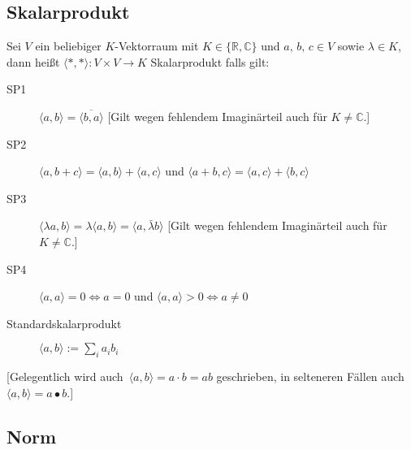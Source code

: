 \subsection{Skalarprodukt}
Sei $V$ ein beliebiger $K$-Vektorraum mit $K\in\{\mathbb{R},\mathbb{C}\}$ und $a,\, b,\, c\in V$ sowie $\lambda\in K$, dann heißt $\langle \ast,\ast \rangle : V\times V\to K$ Skalarprodukt falls gilt:
\begin{description}
  \item [{SP1}]
	$\langle a,b\rangle =\overline{\langle b,a\rangle}$
	[Gilt wegen fehlendem Imaginärteil auch für $K\ne\mathbb{C}$.]
  \item [{SP2}]
	$\langle a,b+c\rangle =\langle a,b\rangle +\langle a,c\rangle $
	und $\langle a+b,c\rangle =\langle a,c\rangle +\langle b,c\rangle $
  \item [{SP3}]
	$\langle \lambda a,b\rangle =\lambda\langle a,b\rangle =\langle a,\bar{\lambda}b\rangle $
	[Gilt wegen fehlendem Imaginärteil auch für $K\ne\mathbb{C}$.]
  \item [{SP4}]
	$\langle a,a \rangle = 0 \iff a=0$
	und $\langle a,a \rangle > 0 \iff a\ne0$
  \item [{Standardskalarprodukt}] $\langle a,b \rangle := \sum_i a_i b_i$
\end{description}

[Gelegentlich wird auch~$\langle a,b \rangle = a \cdot b = ab$ geschrieben, in selteneren Fällen auch~$\langle a,b \rangle = a \bullet b$.]

\subsection{\label{sub:Vektornorm}Norm}

